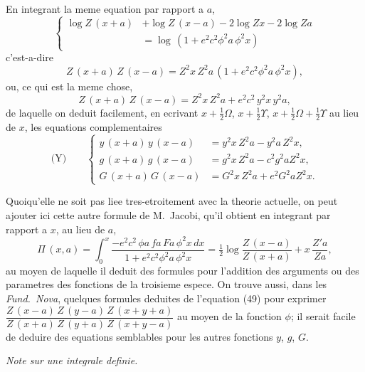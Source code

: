 \documentclass[11pt,a4paper]{article}
\begin{document}
En integrant la meme equation par rapport a $a$,
\begin{equation}
\left\{
\begin{aligned}
\log Z\, (x+a) &+ \log Z\, (x-a) - 2\log Zx - 2\log Za\\
&= \log\, (1 + e^2 c^2 \phi^2 a\, \phi^2 x)
\end{aligned}
\right. \tag{51}
\end{equation}
c'est-a-dire
\begin{equation}
Z\, (x+a)\, Z\, (x-a) = Z^2x\, Z^2a\, (1 + e^2 c^2 \phi^2 a\, \phi^2 x), \tag{52}
\end{equation}
ou, ce qui est la meme chose,
\begin{equation}
Z\, (x+a)\, Z\, (x-a) = Z^2x\, Z^2a + e^2 c^2\, y^2x\, y^2a, \tag{53}
\end{equation}
de laquelle on deduit facilement, en ecrivant $x + \frac{1}{2}\Omega$, $x + \frac{1}{2}\Upsilon$, $x + \frac{1}{2}\Omega + \frac{1}{2}\Upsilon$ au lieu
de $x$, les equations complementaires
\begin{equation*}
\text{(Y)}\qquad
\left\{
\begin{aligned}
y\, (x+a)\, y\, (x-a) &= y^2x\, Z^2a - y^2a\, Z^2x,\\
g\, (x+a)\, g\, (x-a) &= g^2x\, Z^2a - c^2 g^2a Z^2x,\\
G\, (x+a)\, G\, (x-a) &= G^2x\, Z^2a + e^2 G^2a Z^2x.
\end{aligned}
\right.
\end{equation*}

Quoiqu'elle ne soit pas liee tres-etroitement avec la theorie actuelle, on peut
ajouter ici cette autre formule de M.~Jacobi, qu'il obtient en integrant par rapport a $x$,
au lieu de $a$,
\begin{equation}
\Pi\, (x, a) = \int_0^x \frac{-e^2 c^2\, \phi a\, fa\, Fa\, \phi^2 x\, dx}{1 + e^2 c^2 \phi^2 a\, \phi^2 x}
= \tfrac{1}{2}\log \frac{Z\, (x-a)}{Z\, (x+a)} + x\, \frac{Z'a}{Za}, \tag{54}
\end{equation}
au moyen de laquelle il deduit des formules pour l'addition des arguments ou des
parametres des fonctions de la troisieme espece. On trouve aussi, dans les \textit{Fund.~Nova},
quelques formules deduites de l'equation (49) pour exprimer
$\dfrac{Z\, (x-a)\, Z\, (y-a)\, Z\, (x+y+a)}{Z\, (x+a)\, Z\, (y+a)\, Z\, (x+y-a)}$
au moyen de la fonction $\phi$; il serait facile de deduire des equations semblables pour
les autres fonctions $y$, $g$, $G$.

\begin{center}
\textit{Note sur une integrale definie.}
\end{center}
\end{document}
